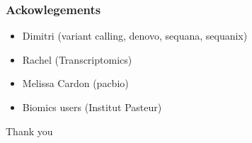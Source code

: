 \documentclass{beamer}
\begin{document}
\begin{frame}
 \frametitle{Ackowlegements}

 \begin{itemize}
  \item Dimitri (variant calling, denovo, sequana, sequanix)
  \item Rachel (Transcriptomics)
  \item Melissa Cardon (pacbio)
  \item Biomics users (Institut Pasteur)
 \end{itemize}
 
\end{frame}


\begin{frame}
\centering
\LARGE
 Thank you 
\end{frame}
\end{document}
